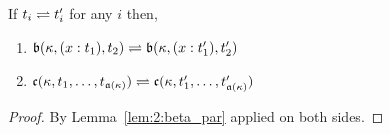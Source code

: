 \begin{lemma}
    If $t_i \rightleftharpoons t_i^\prime$ for any $i$ then,
    \begin{enumerate}
        \item $\mathfrak{b}(\kappa, (x : t_1), t_2) \rightleftharpoons \mathfrak{b}(\kappa, (x : t_1^\prime), t_2^\prime)$
        \item $\mathfrak{c}(\kappa, t_1,\ldots,t_{\mathfrak{a}(\kappa)}) \rightleftharpoons \mathfrak{c}(\kappa, t_1^\prime,\ldots,t_{\mathfrak{a}(\kappa)}^\prime)$
    \end{enumerate}
    \label{lem:2:conv_congr}
\end{lemma}
\begin{proof}
    By Lemma~\ref{lem:2:beta_par} applied on both sides.
\end{proof}






